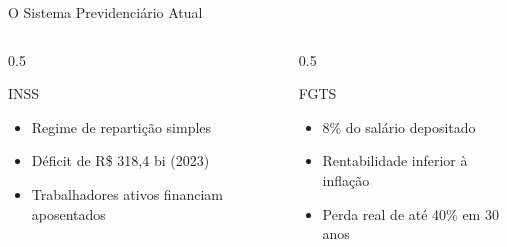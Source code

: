 \documentclass{libs/ufc_format}
\begin{document}
\begin{frame}{O Sistema Previdenciário Atual}
    \begin{columns}
        \begin{column}{0.5\textwidth}
            \begin{block}{INSS}
                \begin{itemize}
                    \item Regime de repartição simples
                    \item Déficit de R\$ 318,4 bi (2023)
                    \item Trabalhadores ativos financiam aposentados
                \end{itemize}
            \end{block}
        \end{column}
        \begin{column}{0.5\textwidth}
            \begin{block}{FGTS}
                \begin{itemize}
                    \item 8\% do salário depositado
                    \item Rentabilidade inferior à inflação
                    \item Perda real de até 40\% em 30 anos
                \end{itemize}
            \end{block}
        \end{column}
    \end{columns}
    
    \vspace{0.4cm}
    
\end{frame}

\end{document}
